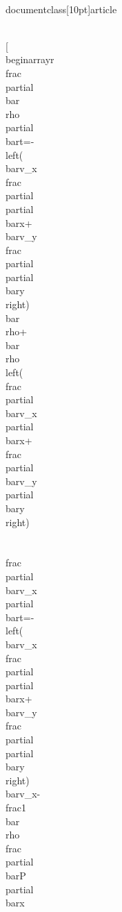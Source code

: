 \\documentclass[10pt]{article}
\begin{document}
\\[
\\begin{array}{r}
\\frac{\\partial \\bar{\\rho}}{\\partial \\bar{t}}=-\\left(\\bar{v}_{x} \\frac{\\partial}{\\partial \\bar{x}}+\\bar{v}_{y} \\frac{\\partial}{\\partial \\bar{y}}\\right) \\bar{\\rho}+\\bar{\\rho}\\left(\\frac{\\partial \\bar{v}_{x}}{\\partial \\bar{x}}+\\frac{\\partial \\bar{v}_{y}}{\\partial \\bar{y}}\\right) \\\\
\\frac{\\partial \\bar{v}_{x}}{\\partial \\bar{t}}=-\\left(\\bar{v}_{x} \\frac{\\partial}{\\partial \\bar{x}}+\\bar{v}_{y} \\frac{\\partial}{\\partial \\bar{y}}\\right) \\bar{v}_{x}-\\frac{1}{\\bar{\\rho}} \\frac{\\partial \\bar{P}}{\\partial \\bar{x}} \\\\
\end{document}
